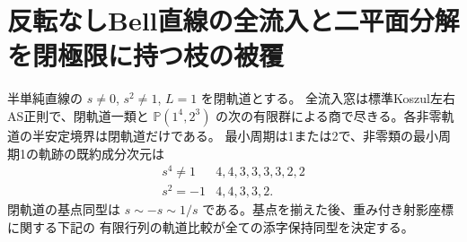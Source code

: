 \section{反転なしBell直線の全流入と二平面分解を閉極限に持つ枝の被覆}
\label{sec:noflip-line-fibers}
\begin{theorem}\label{thm:noflip-line-fibers}
半単純直線の $s\ne0$, $s^2\ne1$, $L=1$ を閉軌道とする。
全流入窓は標準Koszul左右AS正則で、閉軌道一類と
$\mathbb P(1^4,2^3)$ の次の有限群による商で尽きる。各非零軌道の半安定境界は閉軌道だけである。
最小周期は1または2で、非零類の最小周期1の軌跡の既約成分次元は
\[
 \begin{array}{c|l}
 s^4\ne1 & 4,4,3,3,3,3,2,2\\
 s^2=-1 & 4,4,3,3,2 .
 \end{array}
\]
閉軌道の基点同型は $s\sim-s\sim1/s$ である。基点を揃えた後、重み付き射影座標に関する下記の
有限行列の軌道比較が全ての添字保持同型を決定する。
\end{theorem}
